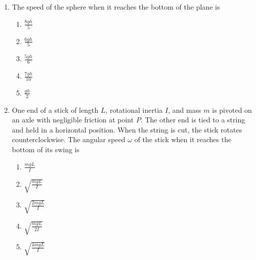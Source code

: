 \documentclass{../../../oss-classkick}
\begin{document}
\begin{multicols*}{2}
\begin{enumerate}[leftmargin=18pt,resume]
\begin{enumerate}[nosep,leftmargin=18pt,label=(\Alph*)]
    \item {}
      
    \item {}
    \end{enumerate}
    \label{hollow1}
    
  \item The speed of the sphere when it reaches the bottom of the plane is
    \begin{enumerate}[nosep,leftmargin=18pt,label=(\Alph*)]
    \item$\displaystyle\frac{8gh}5$
    \item$\displaystyle\frac{6gh}5$
    \item$\displaystyle\frac{5gh}6$
    \item$\displaystyle\frac{7gh}{10}$
    \item$\displaystyle\frac{gh}2$
    \end{enumerate}
    \label{hollow2}
    \columnbreak
    
  \item One end of a stick of length $L$, rotational inertia $I$, and mass $m$
    is pivoted on an axle with negligible friction at point $P$. The other end
    is tied to a string and held in a horizontal position. When the string is
    cut, the stick rotates counterclockwise. The angular speed $\omega$ of the
    stick when it reaches the bottom of its swing is
    \begin{enumerate}[nosep,leftmargin=18pt,label=(\Alph*)]
    \item$\displaystyle\frac{mgL}I$
    \item$\displaystyle\sqrt{\frac{mgL}I}$
    \item$\displaystyle\sqrt{\frac{2mgL}I}$
    \item$\displaystyle\sqrt{\frac{mgL}{2I}}$
    \item$\displaystyle\sqrt{\frac{4mgL}I}$
    \end{enumerate}
  \end{enumerate}
\end{multicols*}
\newpage
\end{document}
